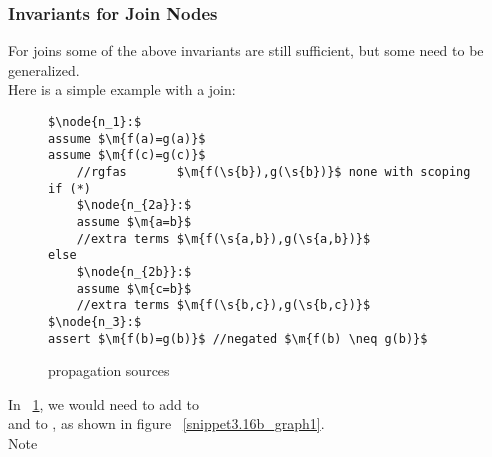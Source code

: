 \subsubsection{Invariants for Join Nodes}
For joins some of the above invariants are still sufficient, but some need to be generalized.\\
Here is a simple example with a join:
\begin{figure}[H]
\begin{lstlisting}
$\node{n_1}:$
assume $\m{f(a)=g(a)}$
assume $\m{f(c)=g(c)}$
	//rgfas       $\m{f(\s{b}),g(\s{b})}$ none with scoping
if (*)
	$\node{n_{2a}}:$
	assume $\m{a=b}$
	//extra terms $\m{f(\s{a,b}),g(\s{a,b})}$
else
	$\node{n_{2b}}:$
	assume $\m{c=b}$
	//extra terms $\m{f(\s{b,c}),g(\s{b,c})}$
$\node{n_3}:$
assert $\m{f(b)=g(b)}$ //negated $\m{f(b) \neq g(b)}$
\end{lstlisting}
\caption{propagation sources}
\label{snippet3.16b}
\end{figure}

In ~\ref{snippet3.16b}, we would need to add  to  \\
and  to , as shown in figure ~\ref{snippet3.16b_graph1}.\\
Note 

